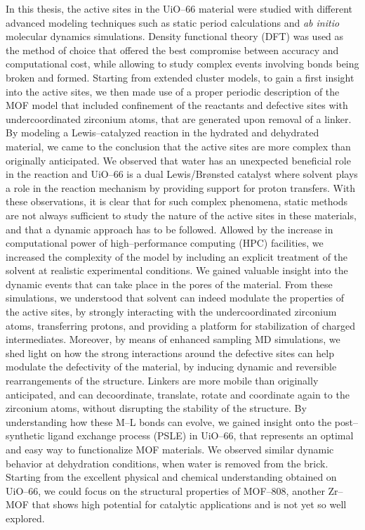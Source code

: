 \npar
In this thesis, the active sites in the UiO--66 material were studied with different advanced modeling techniques such as static period calculations and \textit{ab initio} molecular dynamics simulations. Density functional theory (DFT) was used as the method of choice that offered the best compromise between accuracy and computational cost, while allowing to study complex events involving bonds being broken and formed. Starting from extended cluster models, to gain a first insight into the active sites, we then made use of a proper periodic description of the MOF model that included confinement of the reactants and defective sites with undercoordinated zirconium atoms, that are generated upon removal of a linker. By modeling a Lewis--catalyzed reaction in the hydrated and dehydrated material, we came to the conclusion that the active sites are more complex than originally anticipated. We observed that water has an unexpected beneficial role in the reaction and UiO--66 is a dual Lewis/Br\o{}nsted catalyst where solvent plays a role in the reaction mechanism by providing support for proton transfers. 
\npar
With these observations, it is clear that for such complex phenomena, static methods are not always sufficient to study the nature of the active sites in these materials, and that a dynamic approach has to be followed. Allowed by the increase in computational power of high--performance computing (HPC) facilities, we increased the complexity of the model by including an explicit treatment of the solvent at realistic experimental conditions. We gained valuable insight into the dynamic events that can take place in the pores of the material. From these simulations, we understood that solvent can indeed modulate the properties of the active sites, by strongly interacting with the undercoordinated zirconium atoms, transferring protons, and providing a platform for stabilization of charged intermediates. Moreover, by means of enhanced sampling MD simulations, we shed light on how the strong interactions around the defective sites can help modulate the defectivity of the material, by inducing dynamic and reversible rearrangements of the structure. Linkers are more mobile than originally anticipated, and can decoordinate, translate, rotate and coordinate again to the zirconium atoms, without disrupting the stability of the structure. By understanding how these M--L bonds can evolve, we gained insight onto the post--synthetic ligand exchange process (PSLE) in UiO--66, that represents an optimal and easy way to functionalize MOF materials. We observed similar dynamic behavior at dehydration conditions, when water is removed from the brick. Starting from the excellent physical and chemical understanding obtained on UiO--66, we could focus on the structural properties of MOF--808, another Zr--MOF that shows high potential for catalytic applications and is not yet so well explored. 
